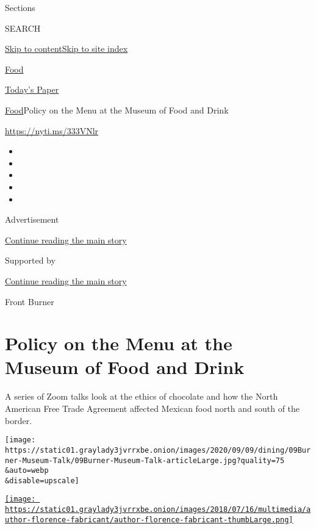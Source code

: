 Sections

SEARCH

\protect\hyperlink{site-content}{Skip to
content}\protect\hyperlink{site-index}{Skip to site index}

\href{https://www.nytimes3xbfgragh.onion/section/food}{Food}

\href{https://myaccount.nytimes3xbfgragh.onion/auth/login?response_type=cookie\&client_id=vi}{}

\href{https://www.nytimes3xbfgragh.onion/section/todayspaper}{Today's
Paper}

\href{/section/food}{Food}\textbar{}Policy on the Menu at the Museum of
Food and Drink

\url{https://nyti.ms/333VNlr}

\begin{itemize}
\item
\item
\item
\item
\item
\end{itemize}

Advertisement

\protect\hyperlink{after-top}{Continue reading the main story}

Supported by

\protect\hyperlink{after-sponsor}{Continue reading the main story}

Front Burner

\hypertarget{policy-on-the-menu-at-the-museum-of-food-and-drink}{%
\section{Policy on the Menu at the Museum of Food and
Drink}\label{policy-on-the-menu-at-the-museum-of-food-and-drink}}

A series of Zoom talks look at the ethics of chocolate and how the North
American Free Trade Agreement affected Mexican food north and south of
the border.

\texttt{[image: https://static01.graylady3jvrrxbe.onion/images/2020/09/09/dining/09Burner-Museum-Talk/09Burner-Museum-Talk-articleLarge.jpg?quality=75\\\&auto=webp\\\&disable=upscale]}

\href{https://www.nytimes3xbfgragh.onion/by/florence-fabricant}{\texttt{[image: https://static01.graylady3jvrrxbe.onion/images/2018/07/16/multimedia/author-florence-fabricant/author-florence-fabricant-thumbLarge.png]}}

